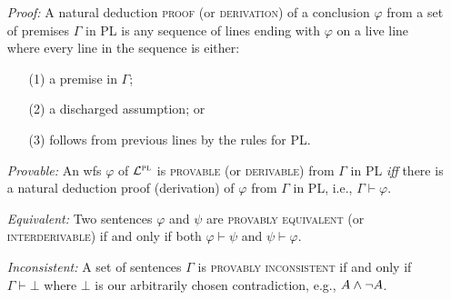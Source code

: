 \documentclass[a4paper, 11pt]{article} %
\begin{document}
\begin{enumerate}
  \item[\it Proof:] A natural deduction \textsc{proof} (or \textsc{derivation}) of a conclusion $\varphi$ from a set of premises $\Gamma$ in PL is any sequence of lines ending with $\varphi$ on a live line where every line in the sequence is either:
      \begin{itemize}
        \item[(1)] a premise in $\Gamma$; 
        \item[(2)] a discharged assumption; or
        \item[(3)] follows from previous lines by the rules for PL.
      \end{itemize}
  \item[\it Provable:] An wfs $\varphi$ of $\mathcal{L}^{\textsc{pl}}$ is \textsc{provable} (or \textsc{derivable}) from $\Gamma$ in PL \textit{iff} there is a natural deduction proof (derivation) of $\varphi$ from $\Gamma$ in PL, i.e., $\Gamma \vdash \varphi$. 
  \item[\it Equivalent:] Two sentences $\varphi$ and $\psi$ are \textsc{provably equivalent} (or \textsc{interderivable}) if and only if both $\varphi\vdash\psi$ and $\psi\vdash\varphi$.
  \item[\it Inconsistent:] A set of sentences $\Gamma$ is \textsc{provably inconsistent} if and only if $\Gamma\vdash\bot$ where $\bot$ is our arbitrarily chosen contradiction, e.g., $A\wedge\neg A$.
\end{enumerate}
\end{document}
